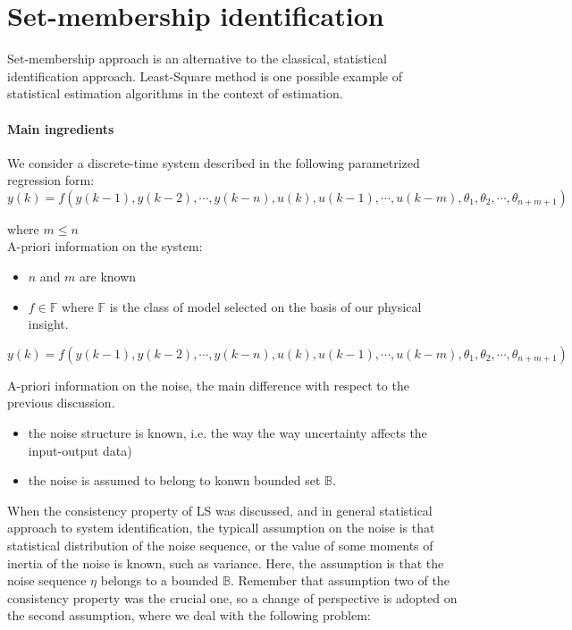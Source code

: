 \chapter{Set-membership identification}    %

Set-membership approach is an alternative to the classical, statistical identification approach. Least-Square method is one possible example of statistical estimation algorithms in the context of estimation.\\

\subsubsection{Main ingredients}

We consider a discrete-time system described in the following parametrized regression form:\\
\begin{equation}
y(k) = f(y(k-1), y(k-2), \cdots, y(k-n), u(k), u(k-1), \cdots, u(k-m), \theta_1, \theta_2, \cdots, \theta_{n+m+1})
\end{equation}

where \(m\leq n\)\\
A-priori information on the system:
\begin{itemize}
    \item \(n\) and \(m\) are known
    \item \(f \in \mathbb{F}\) where \(\mathbb{F}\) is the class of model selected on the basis of our physical insight.
\end{itemize}


\begin{equation}
y(k) = f(y(k-1), y(k-2), \cdots, y(k-n), u(k), u(k-1), \cdots, u(k-m), \theta_1, \theta_2, \cdots, \theta_{n+m+1})
\end{equation}

A-priori information on the noise, the main difference with respect to the previous discussion.
\begin{itemize}
    \item the noise structure is known, i.e. the way the way uncertainty affects the input-output data)
    \item the noise is assumed to belong to konwn bounded set \(\mathbb{B}\).
\end{itemize}

When the consistency property of LS was discussed, and in general statistical approach to system identification, the typicall assumption on the noise is that statistical distribution of the noise sequence, or the value of some moments of inertia of the noise is known, such as variance. Here, the assumption is that the noise sequence \(\eta\) belongs to a bounded \(\mathbb{B}\). Remember that assumption two of the consistency property was the crucial one, so a change of perspective is adopted on the second assumption, where we deal with the following problem:

